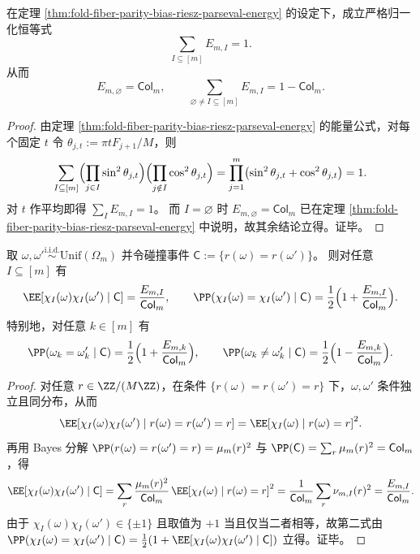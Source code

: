 \begin{corollary}[全体奇偶能量的概率单纯形分解]\label{cor:fold-fiber-parity-energy-simplex}
在定理 \ref{thm:fold-fiber-parity-bias-riesz-parseval-energy} 的设定下，成立严格归一化恒等式
\[
\sum_{I\subseteq[m]}E_{m,I}=1.
\]
从而
\[
E_{m,\varnothing}=\mathsf{Col}_m,
\qquad
\sum_{\varnothing\neq I\subseteq[m]}E_{m,I}=1-\mathsf{Col}_m.
\]
\end{corollary}
\begin{proof}
由定理 \ref{thm:fold-fiber-parity-bias-riesz-parseval-energy} 的能量公式，对每个固定 \(t\) 令 \(\theta_{j,t}:=\pi tF_{j+1}/M\)，则
\[
\sum_{I\subseteq[m]}
\Bigl(\prod_{j\in I}\sin^2\theta_{j,t}\Bigr)\Bigl(\prod_{j\notin I}\cos^2\theta_{j,t}\Bigr)
=\prod_{j=1}^{m}\bigl(\sin^2\theta_{j,t}+\cos^2\theta_{j,t}\bigr)=1.
\]
对 \(t\) 作平均即得 \(\sum_I E_{m,I}=1\)。
而 \(I=\varnothing\) 时 \(E_{m,\varnothing}=\mathsf{Col}_m\) 已在定理 \ref{thm:fold-fiber-parity-bias-riesz-parseval-energy} 中说明，故其余结论立得。证毕。
\end{proof}

\begin{corollary}\label{cor:fold-fiber-collision-parity-correlation}
取 \(\omega,\omega'\overset{\mathrm{i.i.d.}}{\sim}\mathrm{Unif}(\Omega_m)\) 并令碰撞事件 \(\mathsf C:=\{r(\omega)=r(\omega')\}\)。
则对任意 \(I\subseteq[m]\) 有
\[
\EE\!\left[\chi_I(\omega)\chi_I(\omega')\mid \mathsf C\right]
=\frac{E_{m,I}}{\mathsf{Col}_m},
\qquad
\PP\!\left(\chi_I(\omega)=\chi_I(\omega')\mid \mathsf C\right)
=\frac12\Bigl(1+\frac{E_{m,I}}{\mathsf{Col}_m}\Bigr).
\]
特别地，对任意 \(k\in[m]\) 有
\[
\PP(\omega_k=\omega'_k\mid \mathsf C)
=\frac12\Bigl(1+\frac{E_{m,k}}{\mathsf{Col}_m}\Bigr),
\qquad
\PP(\omega_k\neq \omega'_k\mid \mathsf C)
=\frac12\Bigl(1-\frac{E_{m,k}}{\mathsf{Col}_m}\Bigr).
\]
\end{corollary}
\begin{proof}
对任意 \(r\in\ZZ/(M\ZZ)\)，在条件 \(\{r(\omega)=r(\omega')=r\}\) 下，\(\omega,\omega'\) 条件独立且同分布，从而
\[
\EE\!\left[\chi_I(\omega)\chi_I(\omega')\mid r(\omega)=r(\omega')=r\right]
=\EE[\chi_I(\omega)\mid r(\omega)=r]^2.
\]
再用 Bayes 分解 \(\PP(r(\omega)=r(\omega')=r)=\mu_m(r)^2\) 与 \(\PP(\mathsf C)=\sum_r\mu_m(r)^2=\mathsf{Col}_m\)，得
\[
\EE\!\left[\chi_I(\omega)\chi_I(\omega')\mid \mathsf C\right]
=\sum_r\frac{\mu_m(r)^2}{\mathsf{Col}_m}\,\EE[\chi_I(\omega)\mid r(\omega)=r]^2
=\frac{1}{\mathsf{Col}_m}\sum_r\nu_{m,I}(r)^2
=\frac{E_{m,I}}{\mathsf{Col}_m}.
\]
由于 \(\chi_I(\omega)\chi_I(\omega')\in\{\pm 1\}\) 且取值为 \(+1\) 当且仅当二者相等，故第二式由
\(
\PP(\chi_I(\omega)=\chi_I(\omega')\mid \mathsf C)=\frac12(1+\EE[\chi_I(\omega)\chi_I(\omega')\mid \mathsf C])
\)
立得。证毕。
\end{proof}


